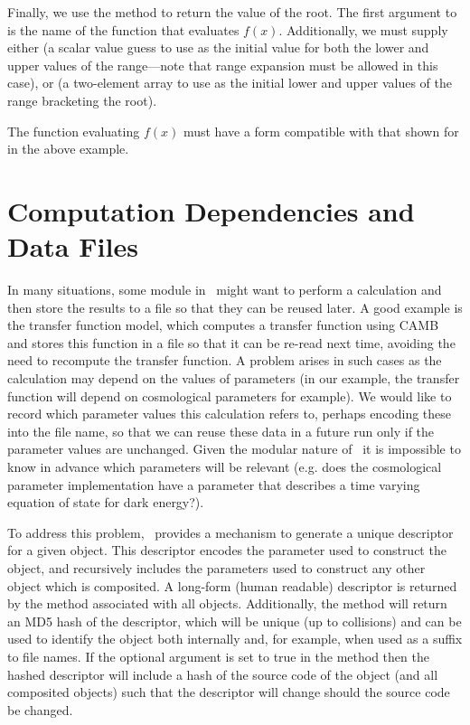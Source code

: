 Finally, we use the  method to return the value of the root. The first argument to  is the name of the function that evaluates $f(x)$. Additionally, we must supply either  (a scalar value guess to use as the initial value for both the lower and upper values of the range---note that range expansion must be allowed in this case), or  (a two-element array to use as the initial lower and upper values of the range bracketing the root).

The function evaluating $f(x)$ must have a form compatible with that shown for  in the above example.

\section{Computation Dependencies and Data Files}\label{sec:codeUniqueLabels}

In many situations, some module in \glc\ might want to perform a calculation and then store the results to a file so that they can be reused later. A good example is the  transfer function model, which computes a transfer function using {\normalfont \scshape CAMB} and stores this function in a file so that it can be re-read next time, avoiding the need to recompute the transfer function. A problem arises in such cases as the calculation may depend on the values of parameters (in our example, the transfer function will depend on cosmological parameters for example). We would like to record which parameter values this calculation refers to, perhaps encoding these into the file name, so that we can reuse these data in a future run only if the parameter values are unchanged. Given the modular nature of \glc\ it is impossible to know in advance which parameters will be relevant (e.g. does the cosmological parameter implementation have a parameter that describes a time varying equation of state for dark energy?). 

To address this problem, \glc\ provides a mechanism to generate a unique descriptor for a given object. This descriptor encodes the parameter used to construct the object, and recursively includes the parameters used to construct any other object which is composited. A long-form (human readable) descriptor is returned by the  method associated with all  objects. Additionally, the  method will return an MD5 hash of the descriptor, which will be unique (up to collisions) and can be used to identify the object both internally and, for example, when used as a suffix to file names. If the optional  argument is set to true in the  method then the hashed descriptor will include a hash of the source code of the object (and all composited objects) such that the descriptor will change should the source code be changed.

